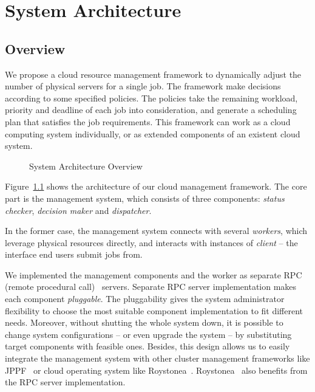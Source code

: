 \chapter{System Architecture}

\section{Overview}

We propose a cloud resource management framework to dynamically adjust the
number of physical servers for a single job.
The framework make decisions according to some specified policies.
The policies take the remaining workload, priority and deadline of each job
into consideration, and generate a scheduling plan that satisfies the job
requirements.
This framework can work as a cloud computing system individually, or as
extended components of an existent cloud system.

\begin{figure}
  \centering
  
  \caption{System Architecture Overview}
  \label{fig:archi-overview}
\end{figure}


Figure~\ref{fig:archi-overview} shows the architecture of our cloud
management framework.
The core part is the management system, which consists of three
components: \emph{status checker}, \emph{decision maker} and
\emph{dispatcher}.

In the former case, the management system connects with several
\emph{workers}, which leverage physical resources directly, and
interacts with instances of \emph{client} -- the interface end users
submit jobs from.

We implemented the management components and the worker as separate RPC
(remote procedural call)~\cite{} servers.
Separate RPC server implementation makes each component
\emph{pluggable}.
The pluggability gives the system administrator flexibility to choose
the most suitable component implementation to fit different needs.
Moreover, without shutting the whole system down, it is possible to
change system configurations -- or even upgrade the system -- by
substituting target components with feasible ones.
Besides, this design allows us to easily integrate the management system
with other cluster management frameworks like JPPF~\cite{cite:JPPF} or
cloud operating system like Roystonea~\cite{cite:roystonea}.
Roystonea~\cite{cite:roystonea} also benefits from the RPC server
implementation.

